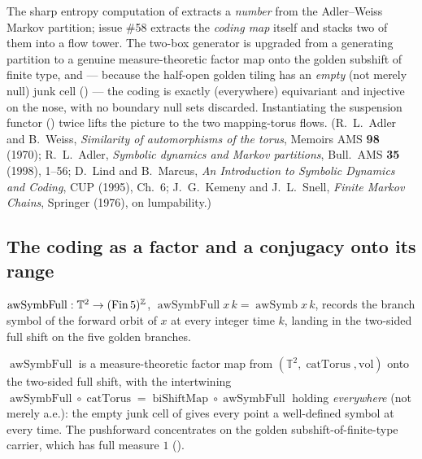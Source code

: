 The sharp entropy computation of  extracts a \emph{number} from the Adler--Weiss
Markov partition; issue \#58 extracts the \emph{coding map} itself and stacks two of them into a
flow tower. The two-box generator  is upgraded from a generating partition to a
genuine measure-theoretic factor map onto the golden subshift of finite type, and --- because the
half-open golden tiling has an \emph{empty} (not merely null) junk cell ()
--- the coding is exactly (everywhere) equivariant and injective on the nose, with no boundary null
sets discarded. Instantiating the suspension functor () twice
lifts the picture to the two mapping-torus flows. (R.~L.\ Adler and B.~Weiss, \emph{Similarity of
automorphisms of the torus}, Memoirs AMS \textbf{98} (1970); R.~L.\ Adler, \emph{Symbolic dynamics
and Markov partitions}, Bull.\ AMS \textbf{35} (1998), 1--56; D.~Lind and B.~Marcus, \emph{An
Introduction to Symbolic Dynamics and Coding}, CUP (1995), Ch.~6; J.~G.\ Kemeny and J.~L.\ Snell,
\emph{Finite Markov Chains}, Springer (1976), on lumpability.)

\subsection{The coding as a factor and a conjugacy onto its range}

\begin{definition}\label{awSymbFull}
  \leanok
  \(\operatorname{awSymbFull} : \mathbb{T}^2\to(\operatorname{Fin} 5)^{\mathbb{Z}}\),
  \(\operatorname{awSymbFull} x\,k = \operatorname{awSymb} x\,k\), records the branch symbol of the
  forward orbit of \(x\) at every integer time \(k\), landing in the two-sided full shift on the five
  golden branches.
\end{definition}

\begin{theorem}\label{isFactorMap_awSymbFull}
  \leanok
  \(\operatorname{awSymbFull}\) is a measure-theoretic factor map from
  \((\mathbb{T}^2, \operatorname{catTorus}, \mathrm{vol})\) onto the two-sided full shift, with the
  intertwining \(\operatorname{awSymbFull}\circ\operatorname{catTorus} = \operatorname{biShiftMap}
  \circ\operatorname{awSymbFull}\) holding \emph{everywhere} (not merely a.e.): the empty junk cell of
   gives every point a well-defined symbol at every time. The pushforward
  concentrates on the golden subshift-of-finite-type carrier, which has full measure \(1\)
  ().
\end{theorem}

